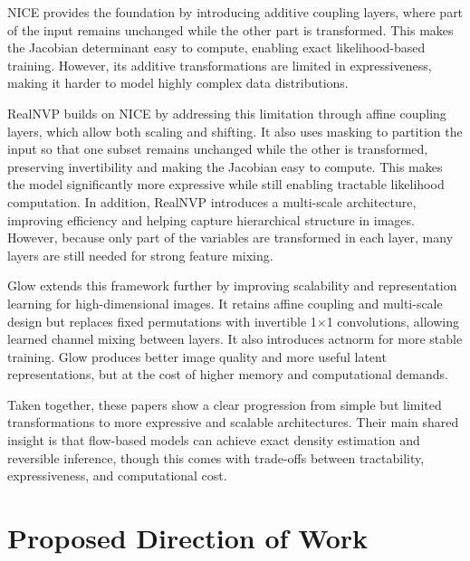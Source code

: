 \documentclass{article}
\begin{document}
    
NICE provides the foundation by introducing additive coupling layers, where part of the input remains unchanged while the other part is transformed. This makes the Jacobian determinant easy to compute, enabling exact likelihood-based training. However, its additive transformations are limited in expressiveness, making it harder to model highly complex data distributions.

RealNVP builds on NICE by addressing this limitation through affine coupling layers, which allow both scaling and shifting. It also uses masking to partition the input so that one subset remains unchanged while the other is transformed, preserving invertibility and making the Jacobian easy to compute. This makes the model significantly more expressive while still enabling tractable likelihood computation. In addition, RealNVP introduces a multi-scale architecture, improving efficiency and helping capture hierarchical structure in images. However, because only part of the variables are transformed in each layer, many layers are still needed for strong feature mixing.

Glow extends this framework further by improving scalability and representation learning for high-dimensional images. It retains affine coupling and multi-scale design but replaces fixed permutations with invertible 1×1 convolutions, allowing learned channel mixing between layers. It also introduces actnorm for more stable training. Glow produces better image quality and more useful latent representations, but at the cost of higher memory and computational demands.

Taken together, these papers show a clear progression from simple but limited transformations to more expressive and scalable architectures. Their main shared insight is that flow-based models can achieve exact density estimation and reversible inference, though this comes with trade-offs between tractability, expressiveness, and computational cost.


\section{Proposed Direction of Work}
\end{document}
